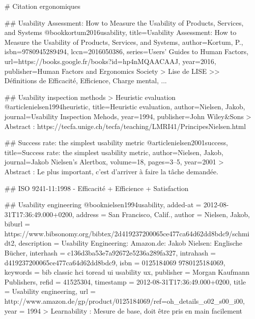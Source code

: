 # Citation ergonomiques

	## Usability Assessment: How to Measure the Usability of Products, Services, and Systems
	@book{kortum2016usability,
		title={Usability Assessment: How to Measure the Usability of Products, Services, and Systems},
		author={Kortum, P.},
		isbn={9780945289494},
		lccn={2016050386},
		series={Users' Guides to Human Factors},
		url={https://books.google.fr/books?id=hp4nMQAACAAJ},
		year={2016},
		publisher={Human Factors and Ergonomics Society}
	}
	> Lise de LISE
		>> Définitions de Efficacité, Efficience, Charge mental, ...


	## Usability inspection methods > Heuristic evaluation
	@article{nielsen1994heuristic,
		title={Heuristic evaluation},
		author={Nielsen, Jakob},
		journal={Usability Inspection Mehods},
		year={1994},
		publisher={John Wiley\&Sons}
	}
	> Abstract : https://tecfa.unige.ch/tecfa/teaching/LMRI41/PrincipesNielsen.html


	## Success rate: the simplest usability metric	
	@article{nielsen2001success,
		title={Success rate: the simplest usability metric},
		author={Nielsen, Jakob},
		journal={Jakob Nielsen’s Alertbox},
		volume={18},
		pages={3--5},
		year={2001}
	}
	> Abstract : Le plus important, c'est d'arriver à faire la tâche demandée.


	## ISO 9241-11:1998
	- Efficacité + Efficience + Satisfaction


	## Usability engineering
	@book{nielsen1994usability,
		added-at = {2012-08-31T17:36:49.000+0200},
		address = {San Francisco, Calif.},
		author = {Nielsen, Jakob},
		biburl = {https://www.bibsonomy.org/bibtex/2d419237200065ce477ca64d62dd8bdc9/schmidt2},
		description = {Usability Engineering: Amazon.de: Jakob Nielsen: Englische Bücher},
		interhash = {c136d3ba53e7a92672e5236a289fa327},
		intrahash = {d419237200065ce477ca64d62dd8bdc9},
		isbn = {0125184069 9780125184069},
		keywords = {bib classic hci toread ui usability ux},
		publisher = {Morgan Kaufmann Publishers},
		refid = {41525304},
		timestamp = {2012-08-31T17:36:49.000+0200},
		title = {Usability engineering},
		url = {http://www.amazon.de/gp/product/0125184069/ref=oh_details_o02_s00_i00},
		year = 1994
	}
	> Learnability : Mesure de base, doit être pris en main facilement


